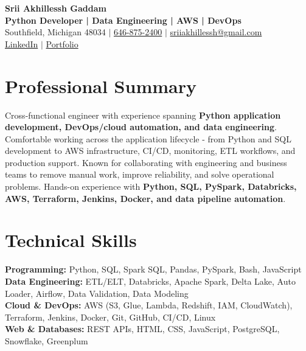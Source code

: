 \documentclass[letterpaper,10pt]{article}
\begin{document}
\fontsize{9.35pt}{10.45pt}\selectfont

\begin{center}
    {\LARGE \textbf{Srii Akhillessh Gaddam}} \\[-1pt]
    \textbf{Python Developer | Data Engineering | AWS | DevOps} \\[2pt]
    Southfield, Michigan 48034 $|$
    \href{tel:6468752400}{646-875-2400} $|$
    \href{mailto:sriiakhillessh@gmail.com}{sriiakhillessh@gmail.com} \\[1pt]
    \href{https://www.linkedin.com/in/srii-akhiilessh-gaddam-b48668191/}{LinkedIn} $|$
    \href{https://sriiakhillesshg.github.io/portfolio/}{Portfolio}
\end{center}
\vspace{-8pt}

\section{Professional Summary}
\small{Cross-functional engineer with experience spanning \textbf{Python application development, DevOps/cloud automation, and data engineering}. Comfortable working across the application lifecycle - from Python and SQL development to AWS infrastructure, CI/CD, monitoring, ETL workflows, and production support. Known for collaborating with engineering and business teams to remove manual work, improve reliability, and solve operational problems. Hands-on experience with \textbf{Python, SQL, PySpark, Databricks, AWS, Terraform, Jenkins, Docker, and data pipeline automation}.}

\section{Technical Skills}
\small{
\textbf{Programming:} Python, SQL, Spark SQL, Pandas, PySpark, Bash, JavaScript \\
\textbf{Data Engineering:} ETL/ELT, Databricks, Apache Spark, Delta Lake, Auto Loader, Airflow, Data Validation, Data Modeling \\
\textbf{Cloud \& DevOps:} AWS (S3, Glue, Lambda, Redshift, IAM, CloudWatch), Terraform, Jenkins, Docker, Git, GitHub, CI/CD, Linux \\
\textbf{Web \& Databases:} REST APIs, HTML, CSS, JavaScript, PostgreSQL, Snowflake, Greenplum
}
\end{document}
